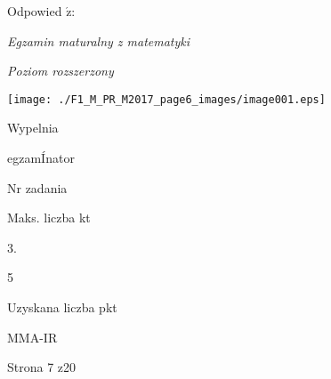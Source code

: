 \documentclass[a4paper,12pt]{article}
\begin{document}
Odpowied $\acute{\mathrm{z}}$:

{\it Egzamin maturalny z matematyki}

{\it Poziom rozszerzony}
\begin{center}
\texttt{[image: ./F1\_M\_PR\_M2017\_page6\_images/image001.eps]}
\end{center}
Wypelnia

egzamÍnator

Nr zadania

Maks. liczba kt

3.

5

Uzyskana liczba pkt

MMA-IR

Strona 7 z20
\end{document}
